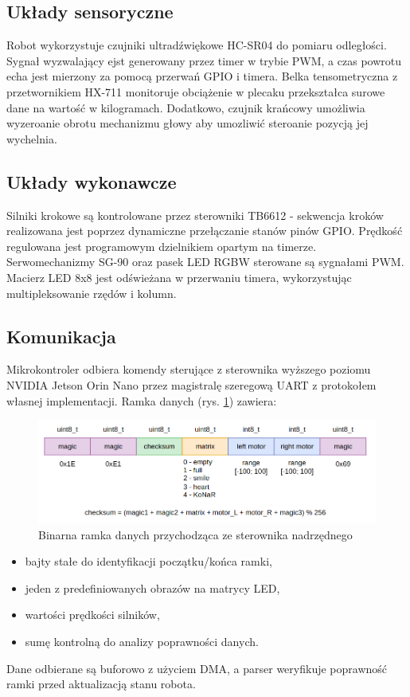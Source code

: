 \documentclass{article}
\begin{document}
        \subsection*{Układy sensoryczne}
            Robot wykorzystuje czujniki ultradźwiękowe HC-SR04 do pomiaru odległości.
            Sygnał wyzwalający ejst generowany przez timer w trybie PWM,
            a czas powrotu echa jest mierzony za pomocą przerwań GPIO i timera.
            Belka tensometryczna z przetwornikiem HX-711 monitoruje obciążenie w plecaku przekształca surowe dane na wartość w kilogramach.
            Dodatkowo, czujnik krańcowy umożliwia wyzeroanie obrotu mechanizmu głowy aby umozliwić steroanie pozycją jej wychelnia.

        \subsection*{Układy wykonawcze}
            Silniki krokowe są kontrolowane przez sterowniki TB6612 - sekwencja kroków realizowana jest poprzez dynamiczne przełączanie stanów pinów GPIO.
            Prędkość regulowana jest programowym dzielnikiem opartym na timerze.
            Serwomechanizmy SG-90 oraz pasek LED RGBW sterowane są sygnałami PWM.
            Macierz LED 8x8 jest odświeżana w przerwaniu timera, wykorzystując multipleksowanie rzędów i kolumn.

        \subsection*{Komunikacja}
            Mikrokontroler odbiera komendy sterujące z sterownika wyższego poziomu NVIDIA Jetson Orin Nano
            przez magistralę szeregową UART z protokołem własnej implementacji.
            Ramka danych (rys. \ref{ramka_danych}) zawiera:
            \begin{figure}[p]
                \centering
                \includegraphics[width=\textwidth]{figures/ramka.png}
                \caption{Binarna ramka danych przychodząca ze sterownika nadrzędnego}
                \label{ramka_danych}
            \end{figure}
            \begin{itemize}
                \item bajty stałe do identyfikacji początku/końca ramki,
                \item jeden z predefiniowanych obrazów na matrycy LED,
                \item wartości prędkości silników,
                \item sumę kontrolną do analizy poprawności danych.
            \end{itemize}
            Dane odbierane są buforowo z użyciem DMA, a parser weryfikuje poprawność ramki przed aktualizacją stanu robota.
\end{document}
